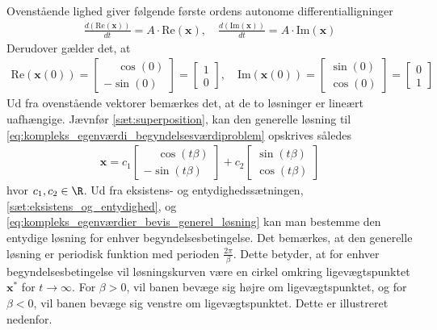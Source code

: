 \begin{bev}
\begin{itemize}
    Ovenstående lighed giver følgende første ordens autonome differentialligninger
    \begin{align*}
        \frac{d\left(\text{Re}\left(\textbf{x}\right)\right)}{dt} = A\cdot\text{Re}\left(\textbf{x}\right) , \quad
        \frac{d\left(\text{Im}\left(\textbf{x}\right)\right)}{dt} = A\cdot\text{Im}\left(\textbf{x}\right)
    \end{align*}
    Derudover gælder det, at
    \begin{align*}
        \text{Re}\left(\textbf{x}(0)\right) = \begin{bmatrix} \phantom{-}\cos(0) \\
        -\sin(0) \end{bmatrix} = \begin{bmatrix} 1 \\
        0 \end{bmatrix}, \quad
        \text{Im}\left(\textbf{x}(0)\right) = \begin{bmatrix} \sin(0) \\
        \cos(0) \end{bmatrix} = \begin{bmatrix} 0 \\
        1 \end{bmatrix} 
    \end{align*}
    Ud fra ovenstående vektorer bemærkes det, at de to løsninger er lineært uafhængige. Jævnfør \autoref{sæt:superposition}, kan den generelle løsning til \eqref{eq:kompleks_egenværdi_begyndelsesværdiproblem} opskrives således
    \begin{align} \label{eq:kompleks_egenværdier_bevis_generel_løsning}
        \textbf{x} = c_1\begin{bmatrix} \phantom{-}\cos(t\beta) \\
        -\sin(t\beta) \end{bmatrix} + c_2\begin{bmatrix} \sin(t\beta) \\
        \cos(t\beta) \end{bmatrix}
    \end{align}
    hvor $c_1,c_2 \in \R$. Ud fra eksistens- og entydighedssætningen, \autoref{sæt:eksistens_og_entydighed}, og \eqref{eq:kompleks_egenværdier_bevis_generel_løsning} kan man bestemme den entydige løsning for enhver begyndelsesbetingelse. Det bemærkes, at den generelle løsning er periodisk funktion med perioden $\frac{2\pi}{\beta}$. Dette betyder, at for enhver begyndelsesbetingelse vil løsningskurven være en cirkel omkring ligevægtspunktet $\textbf{x}^*$ for $t \to \infty$. For $\beta>0$, vil banen bevæge sig højre om ligevægtspunktet, og for $\beta<0$, vil banen bevæge sig venstre om ligevægtspunktet. Dette er illustreret nedenfor.
    

\end{itemize}
\end{bev}
